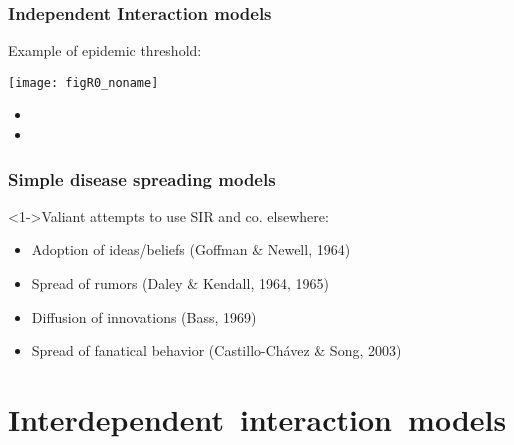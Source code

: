 \begin{frame}
  \frametitle{Independent Interaction models}

  \centering 

  Example of epidemic threshold:

  \texttt{[image: figR0\_noname]}

  \begin{itemize}
  \item {}
  \item {}
  \end{itemize}

\end{frame}

\begin{frame}
  \frametitle{Simple disease spreading models}

  \begin{block}<1->{Valiant attempts to use SIR and co. elsewhere:}
    \begin{itemize}
    \item<2-> Adoption of ideas/beliefs (Goffman \& Newell, 1964)\cite{goffman1964a}
    \item<3-> Spread of rumors (Daley \& Kendall, 1964, 1965)\cite{daley1964a,daley1965a}
    \item<4-> Diffusion of innovations (Bass, 1969)\cite{bass1969a}
    \item<5-> Spread of fanatical behavior (Castillo-Ch\'{a}vez \& Song, 2003)%
    \end{itemize}
  \end{block}


\end{frame}

\section{Interdependent\ interaction\ models}

